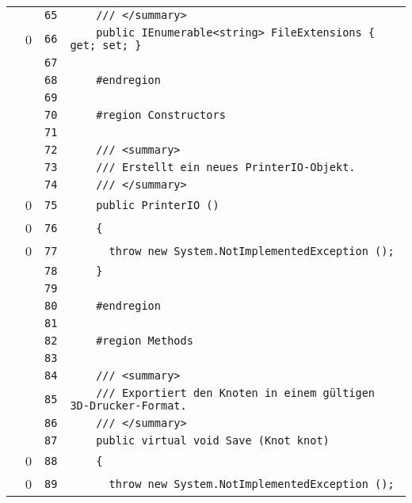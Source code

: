 \documentclass[a4paper,10pt]{article}
\begin{document}
\begin{longtable}[l]{lrrl}
\cellcolor{gray} &  & \verb~65~ & \verb~    /// </summary>~\\
\cellcolor{red} & 0 & \verb~66~ & \verb~    public IEnumerable<string> FileExtensions { get; set; }~\\
\cellcolor{gray} &  & \verb~67~ & \verb~~\\
\cellcolor{gray} &  & \verb~68~ & \verb~    #endregion~\\
\cellcolor{gray} &  & \verb~69~ & \verb~~\\
\cellcolor{gray} &  & \verb~70~ & \verb~    #region Constructors~\\
\cellcolor{gray} &  & \verb~71~ & \verb~~\\
\cellcolor{gray} &  & \verb~72~ & \verb~    /// <summary>~\\
\cellcolor{gray} &  & \verb~73~ & \verb~    /// Erstellt ein neues PrinterIO-Objekt.~\\
\cellcolor{gray} &  & \verb~74~ & \verb~    /// </summary>~\\
\cellcolor{red} & 0 & \verb~75~ & \verb~    public PrinterIO ()~\\
\cellcolor{red} & 0 & \verb~76~ & \verb~    {~\\
\cellcolor{red} & 0 & \verb~77~ & \verb~      throw new System.NotImplementedException ();~\\
\cellcolor{gray} &  & \verb~78~ & \verb~    }~\\
\cellcolor{gray} &  & \verb~79~ & \verb~~\\
\cellcolor{gray} &  & \verb~80~ & \verb~    #endregion~\\
\cellcolor{gray} &  & \verb~81~ & \verb~~\\
\cellcolor{gray} &  & \verb~82~ & \verb~    #region Methods~\\
\cellcolor{gray} &  & \verb~83~ & \verb~~\\
\cellcolor{gray} &  & \verb~84~ & \verb~    /// <summary>~\\
\cellcolor{gray} &  & \verb~85~ & \verb~    /// Exportiert den Knoten in einem gültigen 3D-Drucker-Format.~\\
\cellcolor{gray} &  & \verb~86~ & \verb~    /// </summary>~\\
\cellcolor{gray} &  & \verb~87~ & \verb~    public virtual void Save (Knot knot)~\\
\cellcolor{red} & 0 & \verb~88~ & \verb~    {~\\
\cellcolor{red} & 0 & \verb~89~ & \verb~      throw new System.NotImplementedException ();~\\

\end{longtable}
\end{document}

